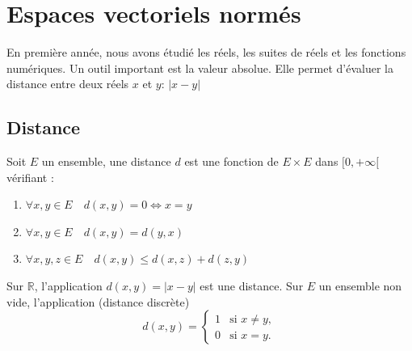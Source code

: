 \chapter{Espaces vectoriels normés}
En première année, nous avons étudié les réels, les suites de réels et les fonctions numériques. Un outil important est la valeur absolue. Elle permet d'évaluer la distance entre deux réels $x$ et $y$: $|x-y|$
\section{Distance}
\begin{definition}
    Soit $E$ un ensemble, une distance $d$ est une fonction de $E\times E$ dans $[0,+\infty[$ vérifiant :
    \begin{enumerate}
        \item $\forall x,y\in E \quad d(x,y)=0 \Leftrightarrow x=y$
        \item $\forall x,y\in E \quad d(x,y)=d(y,x)$
        \item $\forall x,y,z \in E \quad d(x,y)\leq d(x,z)+d(z,y)$
    \end{enumerate}
\end{definition}
\begin{exemple}
Sur $\mathbb{R}$, l'application $d(x,y)=|x-y|$ est une distance. Sur $E$ un ensemble non vide, l'application (distance discrète)
\[
d(x,y)=\begin{cases}
1 & \text{si } x \neq y, \\
0 & \text{si } x = y.
\end{cases}
\]
\end{exemple}
